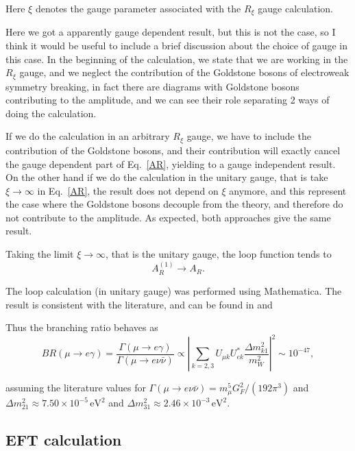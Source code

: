 \documentclass[11pt]{article}
\begin{document}
Here $\xi$ denotes the gauge parameter associated with the $R_\xi$ gauge calculation.

Here we got a apparently gauge dependent result, but this is not the case, so I think it would be useful to include a brief discussion about the choice of gauge in this case. In the beginning of the calculation, we state that we are working in the $R_\xi$ gauge, and we neglect the contribution of the Goldstone bosons of electroweak symmetry breaking, in fact there are diagrams with Goldstone bosons contributing to the amplitude, and we can see their role separating 2 ways of doing the calculation. 

If we do the calculation in an arbitrary $R_\xi$ gauge, we have to include the contribution of the Goldstone bosons, and their contribution will exactly cancel the gauge dependent part of Eq.~\eqref{AR}, yielding to a gauge independent result. On the other hand if we do the calculation in the unitary gauge, that is take $\xi\to\infty$ in Eq.~\eqref{AR}, the result does not depend on $\xi$ anymore, and this represent the case where the Goldstone bosons decouple from the theory, and therefore do not contribute to the amplitude. As expected, both approaches give the same result.

Taking the limit $\xi \to \infty$, that is the unitary gauge, the loop function tends to
\begin{equation}
    A_R^{(1)} \to A_R.
\end{equation}

The loop calculation (in unitary gauge) was performed using Mathematica. The result is consistent with the literature, and can be found in \cite{cheng_li_gauge} and \cite{Calibbi2018}



Thus the branching ratio behaves as
\begin{equation}
    BR(\mu\to e \gamma)=\frac{\Gamma(\mu \to e\gamma)}{\Gamma(\mu \to e\nu\bar\nu)}
    \propto
    \left|
        \sum_{k=2,3}
        U_{\mu k}U^*_{ek}
        \frac{\Delta m_{k1}^2}{m_W^2}
    \right|^2
    \sim 10^{-47},
\end{equation}

assuming the literature values for $\Gamma(\mu\to e\nu\bar\nu)=m_\mu^5 G_F^2/(192\pi^3)$ and $\Delta m_{21}^2 \approx 7.50\times 10^{-5}\,\text{eV}^2$ and $\Delta m_{31}^2 \approx 2.46\times 10^{-3}\,\text{eV}^2$. 

\subsection*{EFT calculation}
\end{document}
